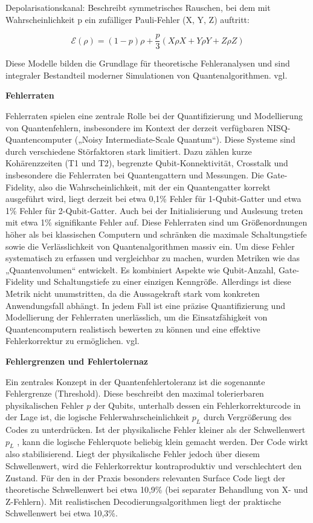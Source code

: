 Depolarisationskanal: Beschreibt symmetrisches Rauschen, bei dem mit Wahrscheinlichkeit p ein zufälliger Pauli-Fehler (X, Y, Z) auftritt:

$$
\mathcal{E}(\rho) = (1-p)\rho + \frac{p}{3}(X\rho X + Y\rho Y + Z\rho Z)
$$


Diese Modelle bilden die Grundlage für theoretische Fehleranalysen und sind integraler Bestandteil moderner Simulationen von Quantenalgorithmen. vgl. \cite[Seite 379-397]{nielsen_quantum_2010}\medskip



\textbf{Fehlerraten}

Fehlerraten spielen eine zentrale Rolle bei der Quantifizierung und Modellierung von Quantenfehlern, insbesondere im Kontext der derzeit verfügbaren NISQ-Quantencomputer („Noisy Intermediate-Scale Quantum“). Diese Systeme sind durch verschiedene Störfaktoren stark limitiert. Dazu zählen kurze Kohärenzzeiten (T1 und T2), begrenzte Qubit-Konnektivität, Crosstalk und insbesondere die Fehlerraten bei Quantengattern und Messungen. Die Gate-Fidelity, also die Wahrscheinlichkeit, mit der ein Quantengatter korrekt ausgeführt wird, liegt derzeit bei etwa 0,1\% Fehler für 1-Qubit-Gatter und etwa 1\% Fehler für 2-Qubit-Gatter. Auch bei der Initialisierung und Auslesung treten mit etwa 1\% signifikante Fehler auf. Diese Fehlerraten sind um Größenordnungen höher als bei klassischen Computern und schränken die maximale Schaltungstiefe sowie die Verlässlichkeit von Quantenalgorithmen massiv ein. Um diese Fehler systematisch zu erfassen und vergleichbar zu machen, wurden Metriken wie das „Quantenvolumen“ entwickelt. Es kombiniert Aspekte wie Qubit-Anzahl, Gate-Fidelity und Schaltungstiefe zu einer einzigen Kenngröße. Allerdings ist diese Metrik nicht unumstritten, da die Aussagekraft stark vom konkreten Anwendungsfall abhängt. In jedem Fall ist eine präzise Quantifizierung und Modellierung der Fehlerraten unerlässlich, um die Einsatzfähigkeit von Quantencomputern realistisch bewerten zu können und eine effektive Fehlerkorrektur zu ermöglichen. vgl. \cite{marre_welche_2021}\medskip



\textbf{Fehlergrenzen und Fehlertolernaz}

Ein zentrales Konzept in der Quantenfehlertoleranz ist die sogenannte Fehlergrenze (Threshold). Diese beschreibt den maximal tolerierbaren physikalischen Fehler \( p \) der Qubits, unterhalb dessen ein Fehlerkorrekturcode in der Lage ist, die logische Fehlerwahrscheinlichkeit 
\( p_{L} \) 
durch Vergrößerung des Codes zu unterdrücken. Ist der physikalische Fehler kleiner als der Schwellenwert \( p_{L} \) , kann die logische Fehlerquote beliebig klein gemacht werden. Der Code wirkt also stabilisierend. Liegt der physikalische Fehler jedoch über diesem Schwellenwert, wird die Fehlerkorrektur kontraproduktiv und verschlechtert den Zustand. Für den in der Praxis besonders relevanten Surface Code liegt der theoretische Schwellenwert bei etwa 10,9\% (bei separater Behandlung von X- und Z-Fehlern). Mit realistischen Decodierungsalgorithmen liegt der praktische Schwellenwert bei etwa 10,3\%.

